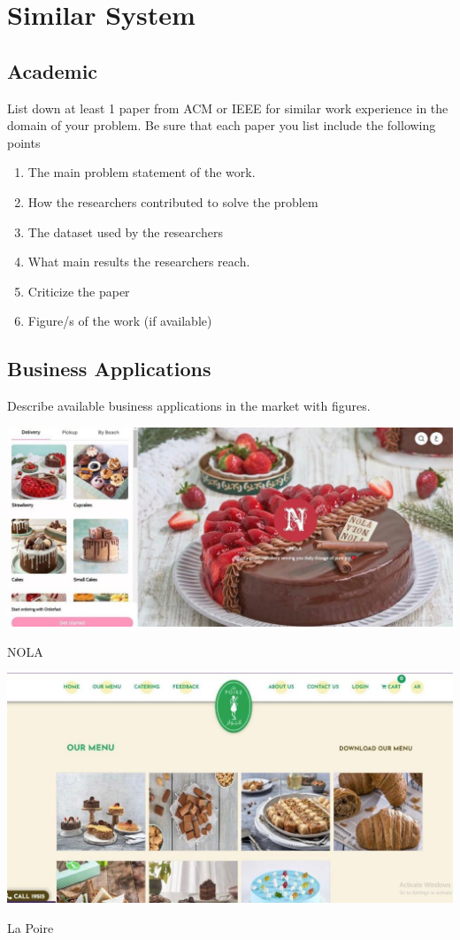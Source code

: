\documentclass[hidelinks,a4paper,12pt]{article}
\begin{document}
\section{Similar System}
\subsection{Academic}

List down at least 1 paper from ACM or IEEE for similar work experience in the domain of your problem. Be sure that each paper you list include the following points

\begin{enumerate}
\item The main problem statement of the work.
\item How the researchers contributed to solve the problem
\item The dataset used by the researchers
\item What main results the researchers reach.
\item Criticize the paper
\item Figure/s of the work (if available)
\end{enumerate}

\subsection{Business Applications}
Describe available business applications in the market with figures.
\begin{Business Applications}
\centering
\includegraphics[width=0.6\linewidth]{Nola.jpg}


NOLA



\centering
\includegraphics[width=0.6\linewidth]{LA poire.jpg}

La Poire

\end{Business Applications}
\end{document}

